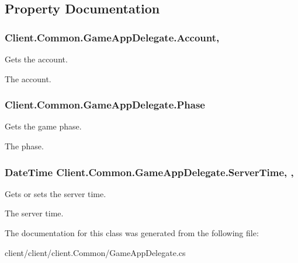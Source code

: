 \subsection{Property Documentation}
\hypertarget{classClient_1_1Common_1_1GameAppDelegate_aa626869ffdd0e3f8f46ab069bc24f0d1}{}
\subsubsection[{Account}]{ Client.\+Common.\+Game\+App\+Delegate.\+Account\hspace{0.3cm}{\ttfamily [static]}, {\ttfamily [get]}}\label{classClient_1_1Common_1_1GameAppDelegate_aa626869ffdd0e3f8f46ab069bc24f0d1}


Gets the account. 

The account.\hypertarget{classClient_1_1Common_1_1GameAppDelegate_a2fb6f0fd7533c38a555760efd3ea896b}{}
\subsubsection[{Phase}]{ Client.\+Common.\+Game\+App\+Delegate.\+Phase\hspace{0.3cm}{\ttfamily [get]}}\label{classClient_1_1Common_1_1GameAppDelegate_a2fb6f0fd7533c38a555760efd3ea896b}


Gets the game phase. 

The phase.\hypertarget{classClient_1_1Common_1_1GameAppDelegate_a53f8c229a2501eb9ae1fcb1c297ef406}{}
\subsubsection[{Server\+Time}]{\setlength{\rightskip}{0pt plus 5cm}Date\+Time Client.\+Common.\+Game\+App\+Delegate.\+Server\+Time\hspace{0.3cm}{\ttfamily [static]}, {\ttfamily [get]}, {\ttfamily [set]}}\label{classClient_1_1Common_1_1GameAppDelegate_a53f8c229a2501eb9ae1fcb1c297ef406}


Gets or sets the server time. 

The server time.

The documentation for this class was generated from the following file\+:\begin{DoxyCompactItemize}
\item 
client/client/client.\+Common/Game\+App\+Delegate.\+cs\end{DoxyCompactItemize}
